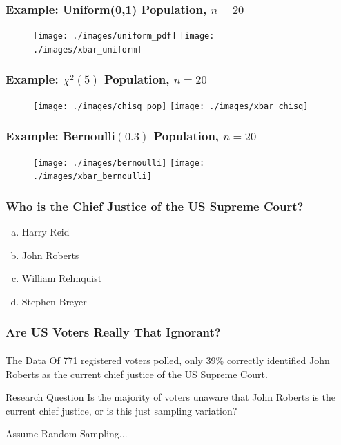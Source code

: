 \documentclass{beamer}
\begin{document}
\begin{frame}
\frametitle{Example: Uniform(0,1) Population, $n = 20$}
\begin{figure}
\centering
\texttt{[image: ./images/uniform\_pdf]}
\texttt{[image: ./images/xbar\_uniform]}
\end{figure}
\end{frame}

\begin{frame}
\frametitle{Example: $\chi^2(5)$ Population, $n = 20$}
\begin{figure}
\centering
\texttt{[image: ./images/chisq\_pop]}
\texttt{[image: ./images/xbar\_chisq]}
\end{figure}
\end{frame}

\begin{frame}
\frametitle{Example: Bernoulli$(0.3)$ Population, $n =20$}
\begin{figure}
\centering
\texttt{[image: ./images/bernoulli]}
\texttt{[image: ./images/xbar\_bernoulli]}
\end{figure}
\end{frame}

\begin{frame}
\frametitle{Who is the Chief Justice of the US Supreme Court?}
	\begin{enumerate}[(a)]
	\item Harry Reid
	\item John Roberts
	\item William Rehnquist
	\item Stephen Breyer
\end{enumerate}


\end{frame}

\begin{frame}
\frametitle{Are US Voters Really That Ignorant?}
\framesubtitle{}

\begin{block}{The Data}
Of 771 registered voters polled, only 39\% correctly identified John Roberts as the current chief justice of the US Supreme Court.
\end{block}

\begin{block}{Research Question}
Is the majority of voters unaware that John Roberts is the current chief justice, or is this just sampling variation?
\end{block}

\alert{Assume Random Sampling...}

\end{frame}
\end{document}
